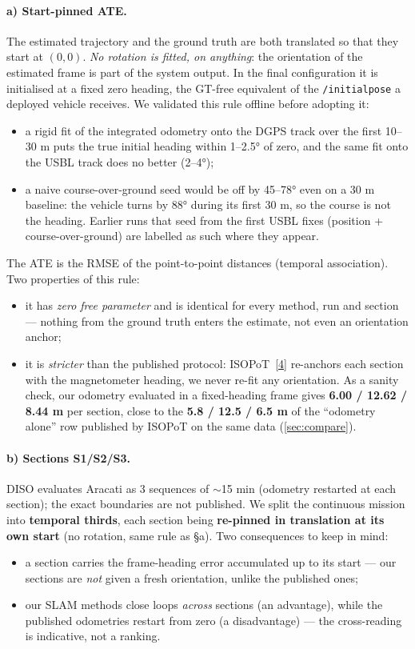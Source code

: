 \paragraph{a) Start-pinned ATE.} The estimated trajectory and the ground truth are
both translated so that they start at $(0,0)$. \emph{No rotation is fitted, on
anything}: the orientation of the estimated frame is part of the system output. In
the final configuration it is initialised at a fixed zero heading, the GT-free
equivalent of the \texttt{/initialpose} a deployed vehicle receives. We validated
this rule offline before adopting it:
\begin{itemize}
\item a rigid fit of the integrated odometry onto the DGPS track over the first
  10--30 m puts the true initial heading within 1--2.5° of zero, and the same fit
  onto the USBL track does no better (2--4°);
\item a naive course-over-ground seed would be off by 45--78° even on a 30 m
  baseline: the vehicle turns by 88° during its first 30 m, so the course is not
  the heading. Earlier runs that seed from the first USBL fixes (position +
  course-over-ground) are labelled as such where they appear.
\end{itemize}
The ATE is the RMSE of the point-to-point distances
(temporal association). Two properties of this rule:
\begin{itemize}
\item it has \emph{zero free parameter} and is identical for every method, run and
  section — nothing from the ground truth enters the estimate, not even an
  orientation anchor;
\item it is \emph{stricter} than the published protocol: ISOPoT~\hyperref[bib:isopot]{[4]} re-anchors each
  section with the magnetometer heading, we never re-fit any orientation. As a
  sanity check, our odometry evaluated in a fixed-heading frame gives
  \textbf{6.00 / 12.62 / 8.44 m} per section, close to the
  \textbf{5.8 / 12.5 / 6.5 m} of the ``odometry alone'' row published by ISOPoT on
  the same data (\autoref{sec:compare}).
\end{itemize}

\paragraph{b) Sections S1/S2/S3.} DISO evaluates Aracati as 3 sequences of
$\sim$15 min (odometry restarted at each section); the exact boundaries are not
published. We split the continuous mission into \textbf{temporal thirds}, each
section being \textbf{re-pinned in translation at its own start} (no rotation, same
rule as §a). Two consequences to keep in mind:
\begin{itemize}
\item a section carries the frame-heading error accumulated up to its start — our
  sections are \emph{not} given a fresh orientation, unlike the published ones;
\item our SLAM methods close loops \emph{across} sections (an advantage), while the
  published odometries restart from zero (a disadvantage) — the cross-reading is
  indicative, not a ranking.
\end{itemize}

